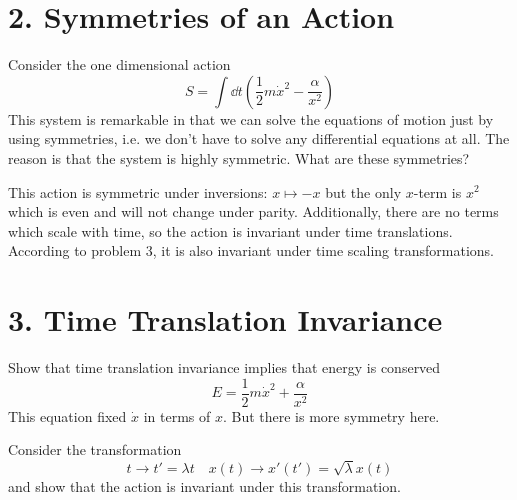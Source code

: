 \documentclass[a4paper,twoside]{article}
\begin{document}
\section*{2. Symmetries of an Action}
Consider the one dimensional action
\begin{equation}
    S = \int \dd{t} \left( \frac{1}{2} m \dot{x}^2 - \frac{\alpha}{x^2} \right)
\end{equation}
This system is remarkable in that we can solve the equations of motion just by using symmetries, i.e. we don't have to solve any differential equations at all. The reason is that the system is highly symmetric. What are these symmetries?

\begin{problem}
    This action is symmetric under inversions: $ x \mapsto -x $ but the only $ x $-term is $ x^2 $ which is even and will not change under parity. Additionally, there are no terms which scale with time, so the action is invariant under time translations. According to problem 3, it is also invariant under time scaling transformations.
\end{problem}

\section*{3. Time Translation Invariance}
Show that time translation invariance implies that energy is conserved
\begin{equation}
    E = \frac{1}{2} m \dot{x}^2 + \frac{\alpha}{x^2}
\end{equation}
This equation fixed $ \dot{x} $ in terms of $ x $. But there is more symmetry here.

Consider the transformation
\begin{equation}
    t \to t' = \lambda t \quad x(t) \to x'(t') = \sqrt{\lambda} x(t)
\end{equation}
and show that the action is invariant under this transformation.
\end{document}
